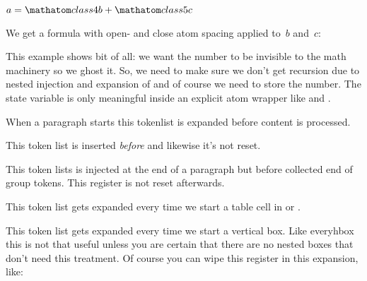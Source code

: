 \startbuffer
\everymathatom
  {\begingroup
   \scratchcounter\lastatomclass
   \everymathatom{}%
   \endgroup}

$ a = \mathatom class 4 {b} + \mathatom class 5 {c} $
\stopbuffer

\typebuffer

We get a formula with open- and close atom spacing applied to~$b$ and~$c$:

{\getbuffer}

This example shows bit of all: we want the number to be invisible to the math
machinery so we ghost it. So, we need to make sure we don't get recursion due to
nested injection and expansion of  and of course we need to
store the number. The  state variable is only meaningful
inside an explicit atom wrapper like  and .

\stopnewprimitive

\startoldprimitive[title={\prm {everypar}}]

When a paragraph starts this tokenlist is expanded before content is processed.

\stopoldprimitive

\startnewprimitive[title={\prm {everyparbegin}}]

This token list is inserted {\em before}  and likewise it's not
reset.

\stopnewprimitive

\startnewprimitive[title={\prm {everyparend}}]

This token lists is injected at the end of a paragraph but before collected end
of group tokens. This register is not reset afterwards.

\stopnewprimitive

\startnewprimitive[title={\prm {everytab}}]

This token list gets expanded every time we start a table cell in  or
.

\stopnewprimitive

\startoldprimitive[title={\prm {everyvbox}}]

This token list gets expanded every time we start a vertical box. Like \prm
{everyhbox} this is not that useful unless you are certain that there are no
nested boxes that don't need this treatment. Of course you can wipe this register
in this expansion, like:

